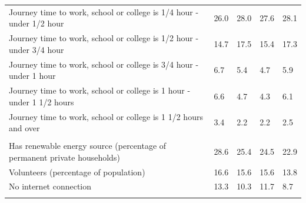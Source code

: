 \documentclass{article}
\begin{document}
\begin{table}[h]
\begin{tabular}{KTTTT}
Journey time to work, school or college is 1/4 hour - under 1/2 hour & 26.0& 28.0& 27.6& 28.1\\
Journey time to work, school or college is 1/2 hour - under 3/4 hour & 14.7& 17.5& 15.4& 17.3\\
Journey time to work, school or college is 3/4 hour - under 1 hour & 6.7& 5.4& 4.7& 5.9\\
Journey time to work, school or college is 1 hour - under 1 1/2 hours & 6.6& 4.7& 4.3& 6.1\\
Journey time to work, school or college is 1 1/2 hours and over & 3.4& 2.2& 2.2& 2.5\\
\hline
    \\ 
    \hline
Has renewable energy source (percentage of permanent private households) & 28.6& 25.4& 24.5& 22.9\\
    \hline
Volunteers (percentage of population) & 16.6& 15.6& 15.6& 13.8\\
    \hline
No internet connection& 13.3& 10.3& 11.7&  8.7\\
\hline
\end{tabular}
\end{table}
\end{document}
